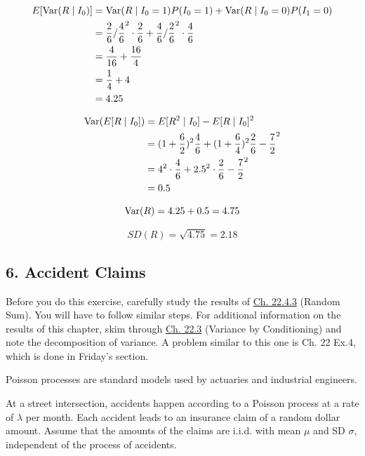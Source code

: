 \documentclass[11pt]{article}
\begin{document}
\begin{align*}
	E[\operatorname{Var}(R \mid I_0)] &= \operatorname{Var}(R \mid I_0 = 1)P(I_0 = 1) + \operatorname{Var}(R \mid I_0 = 0)P(I_1=0) \\
	&= \frac{2}{6} / \frac{4}{6}^{2} \cdot \frac{2}{6} + \frac{4}{6} / \frac{2}{6}^{2} \cdot \frac{4}{6} \\
	&= \frac{4}{16} + \frac{16}{4} \\
	&= \frac{1}{4} + 4 \\
	&= 4.25 \\
\end{align*}



\begin{align*}
	\operatorname{Var}(E[R \mid I_0]) &= E[R^{2} \mid I_0] - E[R \mid I_0]^{2} \\
	&= (1 + \frac{6}{2})^{2} \frac{4}{6} + (1 + \frac{6}{4})^{2}\frac{2}{6}- \frac{7}{2}^{2}\\
	&= 4^{2} \cdot \frac{4}{6} + 2.5^{2} \cdot \frac{2}{6} - \frac{7}{2}^{2} \\
	&= 0.5 \\
\end{align*}

\[
\operatorname{Var}(R) = 4.25  + 0.5 = 4.75
\]

\[
	SD(R) = \sqrt{4.75} = 2.18
\]
    \newpage

    \hypertarget{accident-claims}{%
\subsection{6. Accident Claims}\label{accident-claims}}

Before you do this exercise, carefully study the results of
\href{https://data140.org/textbook/content/chapter-22/examples/\#random-sum}{Ch.
22.4.3} (Random Sum). You will have to follow similar steps. For
additional information on the results of this chapter, skim through
\href{https://data140.org/textbook/content/chapter-22/variance-by-conditioning/}{Ch.
22.3} (Variance by Conditioning) and note the decomposition of variance.
A problem similar to this one is Ch. 22 Ex.4, which is done in Friday's
section.

Poisson processes are standard models used by actuaries and industrial
engineers.

At a street intersection, accidents happen according to a Poisson
process at a rate of \(\lambda\) per month. Each accident leads to an
insurance claim of a random dollar amount. Assume that the amounts of
the claims are i.i.d. with mean \(\mu\) and SD \(\sigma\), independent
of the process of accidents.
\end{document}
